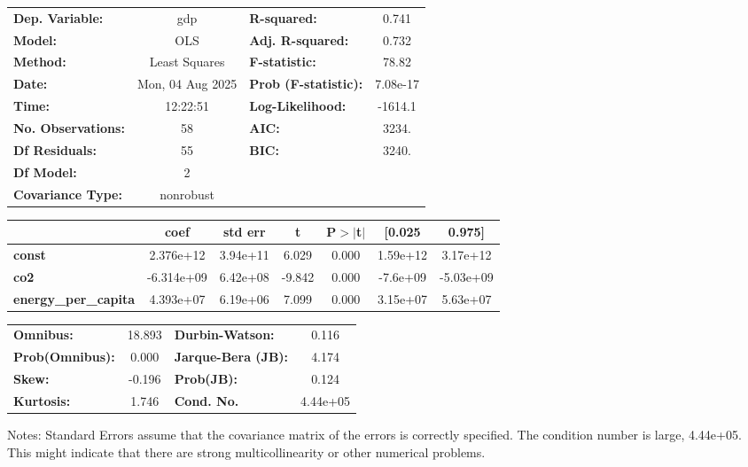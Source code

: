 \begin{center}
\begin{tabular}{lclc}
\toprule
\textbf{Dep. Variable:}      &       gdp        & \textbf{  R-squared:         } &     0.741   \\
\textbf{Model:}              &       OLS        & \textbf{  Adj. R-squared:    } &     0.732   \\
\textbf{Method:}             &  Least Squares   & \textbf{  F-statistic:       } &     78.82   \\
\textbf{Date:}               & Mon, 04 Aug 2025 & \textbf{  Prob (F-statistic):} &  7.08e-17   \\
\textbf{Time:}               &     12:22:51     & \textbf{  Log-Likelihood:    } &   -1614.1   \\
\textbf{No. Observations:}   &          58      & \textbf{  AIC:               } &     3234.   \\
\textbf{Df Residuals:}       &          55      & \textbf{  BIC:               } &     3240.   \\
\textbf{Df Model:}           &           2      & \textbf{                     } &             \\
\textbf{Covariance Type:}    &    nonrobust     & \textbf{                     } &             \\
\bottomrule
\end{tabular}
\begin{tabular}{lcccccc}
                             & \textbf{coef} & \textbf{std err} & \textbf{t} & \textbf{P$> |$t$|$} & \textbf{[0.025} & \textbf{0.975]}  \\
\midrule
\textbf{const}               &    2.376e+12  &     3.94e+11     &     6.029  &         0.000        &     1.59e+12    &     3.17e+12     \\
\textbf{co2}                 &   -6.314e+09  &     6.42e+08     &    -9.842  &         0.000        &     -7.6e+09    &    -5.03e+09     \\
\textbf{energy\_per\_capita} &    4.393e+07  &     6.19e+06     &     7.099  &         0.000        &     3.15e+07    &     5.63e+07     \\
\bottomrule
\end{tabular}
\begin{tabular}{lclc}
\textbf{Omnibus:}       & 18.893 & \textbf{  Durbin-Watson:     } &    0.116  \\
\textbf{Prob(Omnibus):} &  0.000 & \textbf{  Jarque-Bera (JB):  } &    4.174  \\
\textbf{Skew:}          & -0.196 & \textbf{  Prob(JB):          } &    0.124  \\
\textbf{Kurtosis:}      &  1.746 & \textbf{  Cond. No.          } & 4.44e+05  \\
\bottomrule
\end{tabular}
\end{center}

Notes: \newline
 [1] Standard Errors assume that the covariance matrix of the errors is correctly specified. \newline
 [2] The condition number is large, 4.44e+05. This might indicate that there are \newline
 strong multicollinearity or other numerical problems.